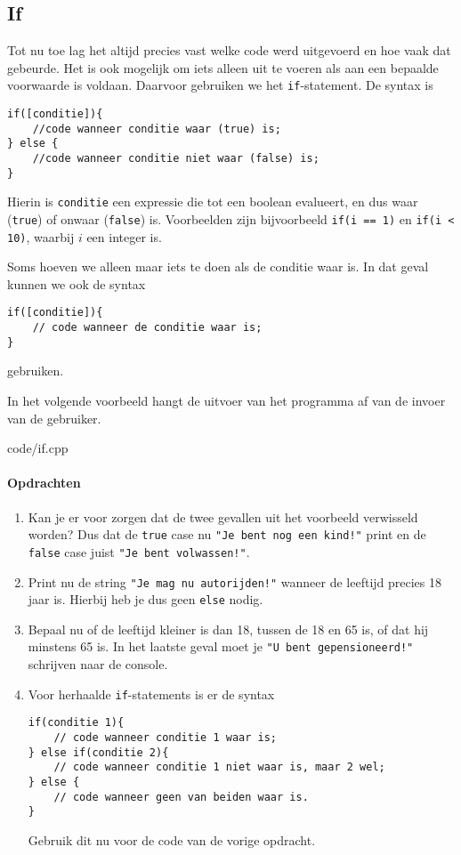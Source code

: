 \documentclass[12pt,a4paper]{article}
\newcommand{\code}{}
\newcommand{\icode}{\lstinline}
\begin{document}
\subsection{If}
Tot nu toe lag het altijd precies vast welke code werd uitgevoerd en hoe vaak dat gebeurde. Het is ook mogelijk om iets alleen uit te voeren als aan een bepaalde voorwaarde is voldaan. Daarvoor gebruiken we het \icode{if}-statement. De syntax is
\begin{lstlisting}
if([conditie]){
	//code wanneer conditie waar (true) is;
} else {
	//code wanneer conditie niet waar (false) is;
}
\end{lstlisting}
Hierin is \icode{conditie} een expressie die tot een boolean evalueert, en dus waar (\icode{true}) of onwaar (\icode{false}) is. Voorbeelden zijn bijvoorbeeld \icode{if(i == 1)} en \icode{if(i < 10)}, waarbij $i$ een integer is. 

Soms hoeven we alleen maar iets te doen als de conditie waar is. In dat geval kunnen we ook de syntax
\begin{lstlisting}
if([conditie]){
	// code wanneer de conditie waar is;
}
\end{lstlisting}
gebruiken.

In het volgende voorbeeld hangt de uitvoer van het programma af van de invoer van de gebruiker.

\code{code/if.cpp}

\paragraph{Opdrachten}
\begin{enumerate}
		\item
		Kan je er voor zorgen dat de twee gevallen uit het voorbeeld verwisseld worden? Dus dat de \icode{true} case nu \icode{"Je bent nog een kind!"} print en de \icode{false} case juist \icode{"Je bent volwassen!"}.
		\item
			Print nu de string \icode{"Je mag nu autorijden!"} wanneer de leeftijd precies 18 jaar is. Hierbij heb je dus geen \icode{else} nodig.
		\item
			Bepaal nu of de leeftijd kleiner is dan 18, tussen de 18 en 65 is, of dat hij minstens 65 is. In het laatste geval moet je \icode{"U bent gepensioneerd!"} schrijven naar de console.
		\item
			Voor herhaalde \icode{if}-statements is er de syntax
\begin{lstlisting}
if(conditie 1){
	// code wanneer conditie 1 waar is;
} else if(conditie 2){
	// code wanneer conditie 1 niet waar is, maar 2 wel;
} else {
	// code wanneer geen van beiden waar is.
}
\end{lstlisting}
Gebruik dit nu voor de code van de vorige opdracht.
\end{enumerate}
\end{document}
